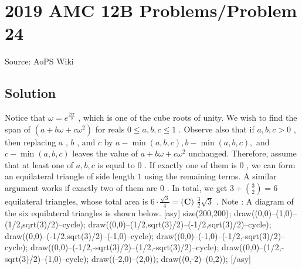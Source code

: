 \documentclass[12pt]{article}
\begin{document}
\section*{{2019 AMC 12B Problems/Problem 24}}
Source: AoPS Wiki

\subsection*{Solution}
Notice that $\omega=e^{\frac{2i\pi}{3}}$ , which is one of the cube roots of unity. We wish to find the span of $(a+b\omega+c\omega^2)$ for reals $0\le a,b,c\le 1$ .
Observe also that if $a,b,c>0$ , then replacing $a$ , $b$ , and $c$ by $a-\min(a,b,c), b-\min(a,b,c),$ and $c-\min(a,b,c)$ leaves the value of $a+b\omega+c\omega^2$ unchanged. Therefore, assume that at least one of $a,b,c$ is equal to $0$ . If exactly one of them is $0$ , we can form an equilateral triangle of side length $1$ using the remaining terms. A similar argument works if exactly two of them are $0$ . In total, we get $3+{3 \choose 2} = 6$ equilateral triangles, whose total area is $6 \cdot \frac{\sqrt{3}}{4} = \boxed{\textbf{(C) } \frac{3}{2}\sqrt3}$ . Note : A diagram of the six equilateral triangles is shown below. [asy] size(200,200); draw((0,0)--(1,0)--(1/2,sqrt(3)/2)--cycle); draw((0,0)--(1/2,sqrt(3)/2)--(-1/2,sqrt(3)/2)--cycle); draw((0,0)--(-1/2,sqrt(3)/2)--(-1,0)--cycle); draw((0,0)--(-1,0)--(-1/2,-sqrt(3)/2)--cycle); draw((0,0)--(-1/2,-sqrt(3)/2)--(1/2,-sqrt(3)/2)--cycle); draw((0,0)--(1/2,-sqrt(3)/2)--(1,0)--cycle); draw((-2,0)--(2,0)); draw((0,-2)--(0,2)); [/asy]
\end{document}
